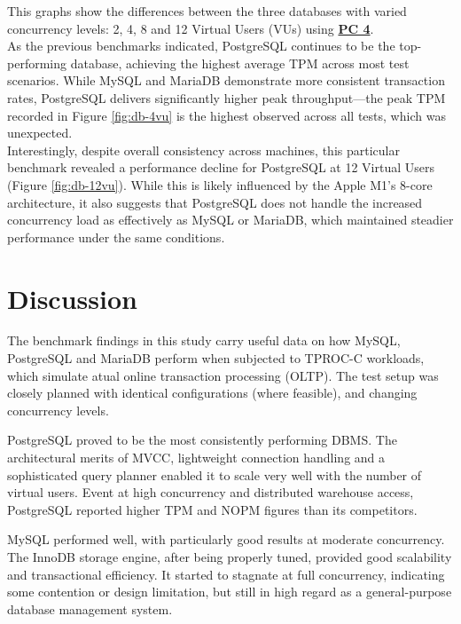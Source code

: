 This graphs show the differences between the three databases with varied concurrency levels: 2, 4, 8 and 12 Virtual Users (VUs) using \textbf{\hyperref[tab:hardware-setup]{PC 4}}.\\

As the previous benchmarks indicated, PostgreSQL continues to be the top-performing database, achieving the highest average TPM across most test scenarios. While MySQL and MariaDB demonstrate more consistent transaction rates, PostgreSQL delivers significantly higher peak throughput—the peak TPM recorded in Figure \ref{fig:db-4vu} is the highest observed across all tests, which was unexpected.\\

Interestingly, despite overall consistency across machines, this particular benchmark revealed a performance decline for PostgreSQL at 12 Virtual Users  (Figure \ref{fig:db-12vu}). While this is likely influenced by the Apple M1’s 8-core architecture, it also suggests that PostgreSQL does not handle the increased concurrency load as effectively as MySQL or MariaDB, which maintained steadier performance under the same conditions.

\newpage
\section{Discussion}
\label{sec:discussion}

The benchmark findings in this study carry useful data on how MySQL, PostgreSQL and MariaDB perform when subjected to TPROC-C workloads, which simulate atual online transaction processing (OLTP). The test setup was closely planned with identical configurations (where feasible), and changing concurrency levels.

PostgreSQL proved to be the most consistently performing DBMS. The architectural merits of MVCC, lightweight connection handling and a sophisticated query planner enabled it to scale very well with the number of virtual users. Event at high concurrency and distributed warehouse access, PostgreSQL reported higher TPM and NOPM figures than its competitors.

MySQL performed well, with particularly good results at moderate concurrency. The InnoDB storage engine, after being properly tuned, provided good scalability and transactional efficiency. It started to stagnate at full concurrency, indicating some contention or design limitation, but still in high regard as a general-purpose database management system.

